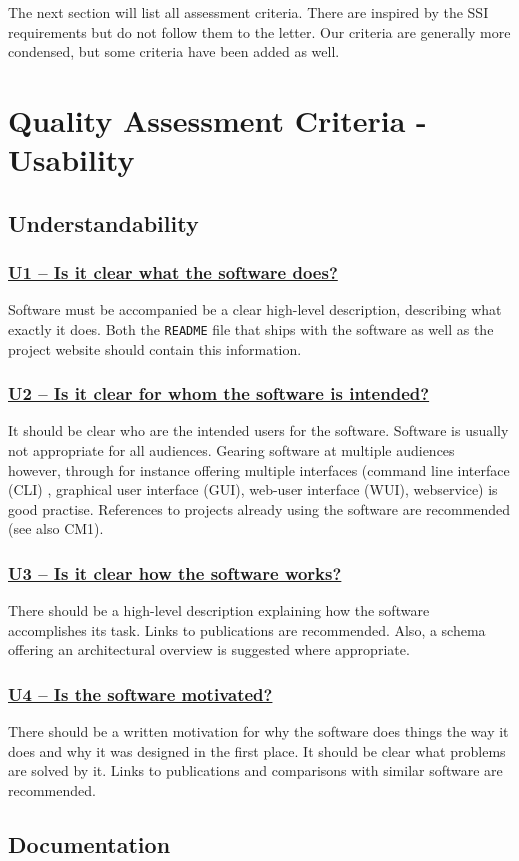 \documentclass[a4paper,11pt]{article}
\newcommand{\criterion}[1]{\subsubsection*{\underline{#1}}}
\begin{document}
The next section will list all assessment criteria. There are inspired by the
SSI requirements but do not follow them to the letter. Our criteria are
generally more condensed, but some criteria have been added as well.

\section{Quality Assessment Criteria - Usability}

\subsection{Understandability}

\criterion{U1 -- Is it clear what the software does?}

Software must be accompanied be a clear high-level description, describing what
exactly it does. Both the \texttt{README} file that ships with the software as well as
the project website should contain this information. 

\criterion{U2 -- Is it clear for whom the software is intended?}

It should be clear who are the intended users for the software. Software is
usually not appropriate for all audiences. Gearing software at multiple
audiences however, through for instance offering multiple interfaces (command
line interface (CLI) , graphical user interface (GUI), web-user interface
(WUI), webservice) is good practise. References to projects already using the
software are recommended (see also CM1).

\criterion{U3 -- Is it clear how the software works?}

There should be a high-level description explaining how the software
accomplishes its task. Links to publications are recommended. Also, a schema
offering an architectural overview is suggested where appropriate. 

\criterion{U4 -- Is the software motivated?}

There should be a written motivation for why the software does things the way
it does and why it was designed in the first place. It should be clear what
problems are solved by it. Links to publications and comparisons with similar
software are recommended.

\subsection{Documentation}
\end{document}
